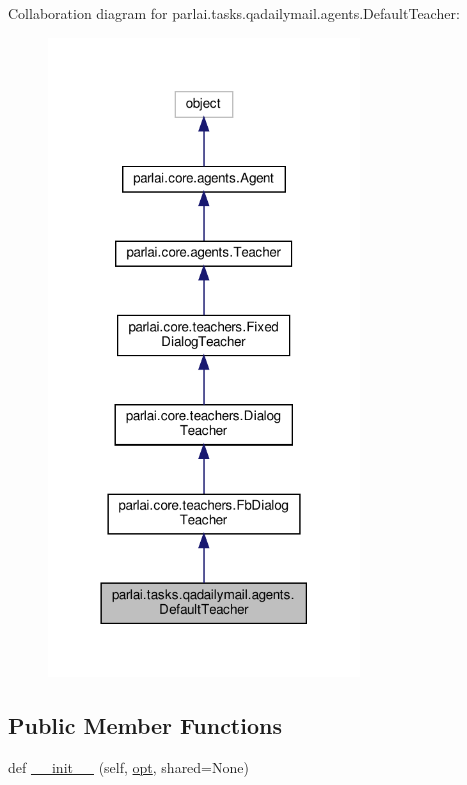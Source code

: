 Collaboration diagram for parlai.\+tasks.\+qadailymail.\+agents.\+Default\+Teacher\+:
\nopagebreak
\begin{figure}[H]
\begin{center}
\leavevmode
\includegraphics[width=234pt]{d6/dc9/classparlai_1_1tasks_1_1qadailymail_1_1agents_1_1DefaultTeacher__coll__graph}
\end{center}
\end{figure}
\subsection*{Public Member Functions}
\begin{DoxyCompactItemize}
\item 
def \hyperlink{classparlai_1_1tasks_1_1qadailymail_1_1agents_1_1DefaultTeacher_a9b9a49fa6e1a61092205f2500fe4f933}{\+\_\+\+\_\+init\+\_\+\+\_\+} (self, \hyperlink{classparlai_1_1core_1_1teachers_1_1FbDialogTeacher_af7a9ec497b9cd0292d7b8fa220da7c28}{opt}, shared=None)
\end{DoxyCompactItemize}
